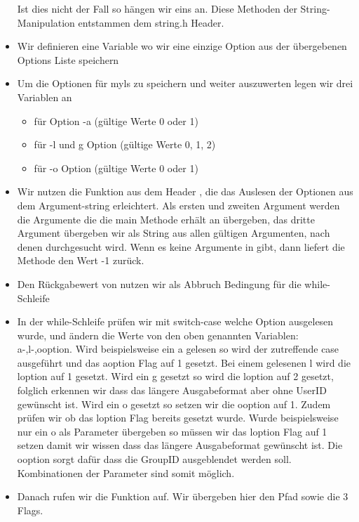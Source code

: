 \begin{itemize}
Ist dies nicht der Fall so hängen wir eins an.
Diese Methoden der String-Manipulation entstammen dem string.h Header.
\item Wir definieren eine Variable  wo wir eine einzige Option
aus der übergebenen Options Liste speichern
\item Um die Optionen für myls zu speichern und weiter auszuwerten legen wir drei Variablen an
\begin{itemize}
	\item {} für Option -a (gültige Werte 0 oder 1)
	\item {} für -l und g Option (gültige Werte 0, 1, 2)
	\item {} für -o Option (gültige Werte 0 oder 1)
\end{itemize}

\item Wir nutzen die Funktion  aus dem Header ,
die das Auslesen der Optionen aus dem Argument-string erleichtert. Als ersten und zweiten Argument
werden die Argumente die die main Methode erhält an  übergeben,
das dritte Argument übergeben wir als String aus allen gültigen Argumenten,
nach denen durchgesucht wird.
Wenn es keine Argumente in  gibt, dann liefert die Methode den Wert -1 zurück.
\item Den Rückgabewert von  nutzen wir als Abbruch Bedingung für die while-Schleife

\item In der while-Schleife prüfen wir mit switch-case welche Option ausgelesen wurde,
und ändern die Werte von den oben genannten Variablen: a-,l-,ooption.
Wird beispielsweise ein a gelesen so wird der zutreffende case ausgeführt
und das aoption Flag auf 1 gesetzt.
Bei einem gelesenen l wird die loption auf 1 gesetzt.
Wird ein g gesetzt so wird die loption auf 2 gesetzt, folglich erkennen wir
dass das längere Ausgabeformat aber ohne UserID gewünscht ist.
Wird ein o gesetzt so setzen wir die ooption auf 1. Zudem prüfen wir
ob das loption Flag bereits gesetzt wurde. Wurde beispielsweise nur ein
o als Parameter übergeben so müssen wir das loption Flag auf 1 setzen damit
wir wissen dass das längere Ausgabeformat gewünscht ist.
Die ooption sorgt dafür dass die GroupID ausgeblendet werden soll.
Kombinationen der Parameter sind somit möglich.
\item Danach rufen wir die Funktion 
auf. Wir übergeben hier den Pfad sowie die 3 Flags.


\end{itemize}
